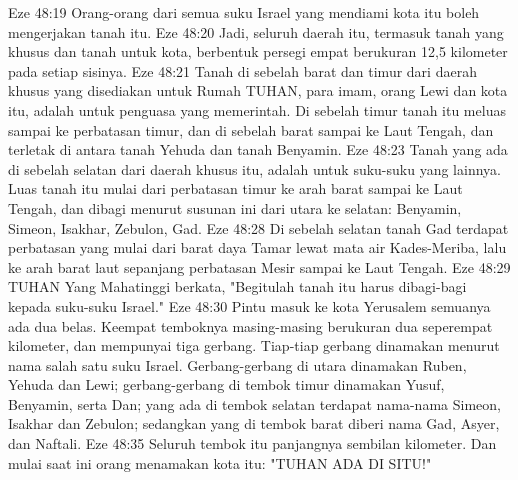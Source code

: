 Eze 48:19  Orang-orang dari semua suku Israel yang mendiami kota itu boleh mengerjakan tanah itu.
Eze 48:20  Jadi, seluruh daerah itu, termasuk tanah yang khusus dan tanah untuk kota, berbentuk persegi empat berukuran 12,5 kilometer pada setiap sisinya.
Eze 48:21  Tanah di sebelah barat dan timur dari daerah khusus yang disediakan untuk Rumah TUHAN, para imam, orang Lewi dan kota itu, adalah untuk penguasa yang memerintah. Di sebelah timur tanah itu meluas sampai ke perbatasan timur, dan di sebelah barat sampai ke Laut Tengah, dan terletak di antara tanah Yehuda dan tanah Benyamin.
Eze 48:23  Tanah yang ada di sebelah selatan dari daerah khusus itu, adalah untuk suku-suku yang lainnya. Luas tanah itu mulai dari perbatasan timur ke arah barat sampai ke Laut Tengah, dan dibagi menurut susunan ini dari utara ke selatan: Benyamin, Simeon, Isakhar, Zebulon, Gad.
Eze 48:28  Di sebelah selatan tanah Gad terdapat perbatasan yang mulai dari barat daya Tamar lewat mata air Kades-Meriba, lalu ke arah barat laut sepanjang perbatasan Mesir sampai ke Laut Tengah.
Eze 48:29  TUHAN Yang Mahatinggi berkata, "Begitulah tanah itu harus dibagi-bagi kepada suku-suku Israel."
Eze 48:30  Pintu masuk ke kota Yerusalem semuanya ada dua belas. Keempat temboknya masing-masing berukuran dua seperempat kilometer, dan mempunyai tiga gerbang. Tiap-tiap gerbang dinamakan menurut nama salah satu suku Israel. Gerbang-gerbang di utara dinamakan Ruben, Yehuda dan Lewi; gerbang-gerbang di tembok timur dinamakan Yusuf, Benyamin, serta Dan; yang ada di tembok selatan terdapat nama-nama Simeon, Isakhar dan Zebulon; sedangkan yang di tembok barat diberi nama Gad, Asyer, dan Naftali.
Eze 48:35  Seluruh tembok itu panjangnya sembilan kilometer. Dan mulai saat ini orang menamakan kota itu: "TUHAN ADA DI SITU!"


